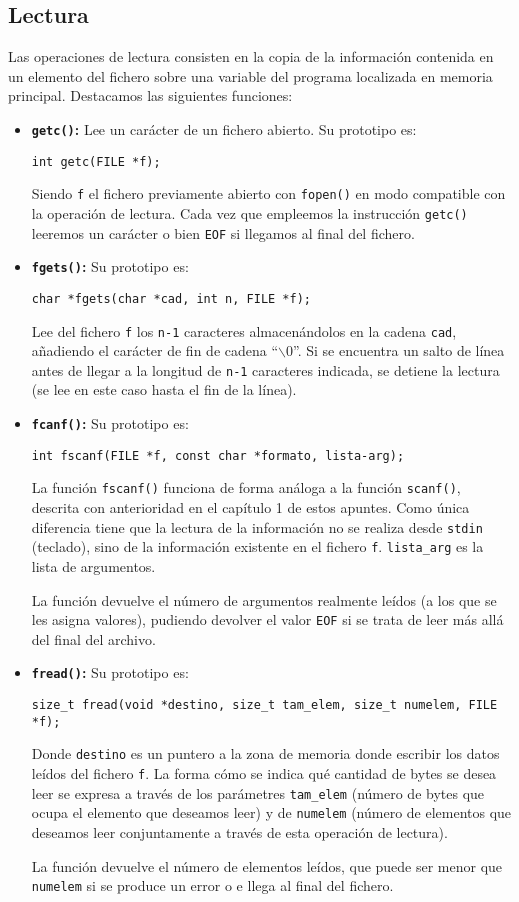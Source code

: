 \subsection{Lectura}{
Las operaciones de lectura consisten en la copia de la información contenida en un elemento del fichero sobre una variable del programa localizada en memoria principal. Destacamos las siguientes funciones:
\begin{itemize}
	\item \textbf{\texttt{getc()}:} Lee un carácter de un fichero abierto. Su prototipo es:
	
	\texttt{int getc(FILE *f);}
	
	Siendo \texttt{f} el fichero previamente abierto con \texttt{fopen()} en modo compatible con la operación de lectura. Cada vez que empleemos la instrucción \texttt{getc()} leeremos un carácter o bien \texttt{EOF} si llegamos al final del fichero.
	
	\item \textbf{\texttt{fgets()}:} Su prototipo es:
	
	\texttt{char *fgets(char *cad, int n, FILE *f);}
	
	Lee del fichero \texttt{f} los \texttt{n-1} caracteres almacenándolos en la cadena \texttt{cad}, añadiendo el carácter de fin de cadena ``$\backslash{0}$''. Si se encuentra un salto de línea antes de llegar a la longitud de \texttt{n-1} caracteres indicada, se detiene la lectura (se lee en este caso hasta el fin de la línea).
	
	\item \textbf{\texttt{fcanf()}:} Su prototipo es:
	
	\texttt{int fscanf(FILE *f, const char *formato, lista-arg);}
	
	La función \texttt{fscanf()} funciona de forma análoga a la función \texttt{scanf()}, descrita con anterioridad en el capítulo 1 de estos apuntes. Como única diferencia tiene que la lectura de la información no se realiza desde \texttt{stdin} (teclado), sino de la información existente en el fichero \texttt{f}. \texttt{lista\_arg} es la lista de argumentos.
	
	La función devuelve el número de argumentos realmente leídos (a los que se les asigna valores), pudiendo devolver el valor \texttt{EOF} si se trata de leer más allá del final del archivo.
	
	\item \textbf{\texttt{fread()}:} Su prototipo es:
	
	\texttt{size\_t fread(void *destino, size\_t tam\_elem, size\_t numelem, FILE *f);}
	
	Donde \texttt{destino} es un puntero a la zona de memoria donde escribir los datos leídos del fichero \texttt{f}. La forma cómo se indica qué cantidad de bytes se desea leer se expresa a través de los parámetres \texttt{tam\_elem} (número de bytes que ocupa el elemento  que deseamos leer) y de \texttt{numelem} (número de elementos que deseamos leer conjuntamente a través de esta operación de lectura).
	
	La función devuelve el número de elementos leídos, que puede ser menor que \texttt{numelem} si se produce un error o e llega al final del fichero.
\end{itemize}
}
